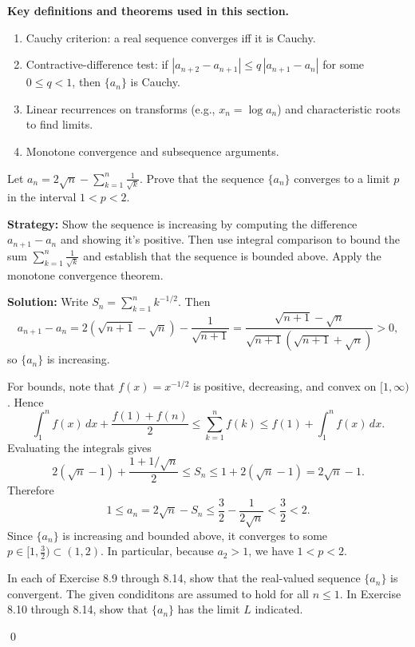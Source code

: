 \noindent\textbf{Key definitions and theorems used in this section.}
\begin{enumerate}
\item Cauchy criterion: a real sequence converges iff it is Cauchy.
\item Contractive-difference test: if \(|a_{n+2}-a_{n+1}|\le q\,|a_{n+1}-a_n|\) for some \(0\le q<1\), then \(\{a_n\}\) is Cauchy.
\item Linear recurrences on transforms (e.g., \(x_n=\log a_n\)) and characteristic roots to find limits.
\item Monotone convergence and subsequence arguments.
\end{enumerate}



\begin{problembox}
Let \(a_n = 2\sqrt{n}-\sum_{k=1}^n \frac{1}{\sqrt{k}}\). Prove that the sequence \(\{a_n\}\) converges to a limit \(p\) in the interval \(1 < p < 2\).
\end{problembox}

\noindent\textbf{Strategy:} Show the sequence is increasing by computing the difference \(a_{n+1}-a_n\) and showing it's positive. Then use integral comparison to bound the sum \(\sum_{k=1}^n \frac{1}{\sqrt{k}}\) and establish that the sequence is bounded above. Apply the monotone convergence theorem.

\bigskip\noindent\textbf{Solution:}
Write \(S_n=\sum_{k=1}^n k^{-1/2}\). Then
\[a_{n+1}-a_n = 2(\sqrt{n+1}-\sqrt{n})-\frac{1}{\sqrt{n+1}} = \frac{\sqrt{n+1}-\sqrt{n}}{\sqrt{n+1}(\sqrt{n+1}+\sqrt{n})} > 0,\]
so \(\{a_n\}\) is increasing.

For bounds, note that \(f(x)=x^{-1/2}\) is positive, decreasing, and convex on \([1,\infty)\). Hence
\[\int_{1}^{n} f(x)\,dx + \frac{f(1)+f(n)}{2} \le \sum_{k=1}^{n} f(k) \le f(1)+\int_{1}^{n} f(x)\,dx.\]
Evaluating the integrals gives
\[2(\sqrt{n}-1)+\frac{1+1/\sqrt{n}}{2} \le S_n \le 1+2(\sqrt{n}-1)=2\sqrt{n}-1.\]
Therefore
\[1 \le a_n = 2\sqrt{n}-S_n \le \frac{3}{2}-\frac{1}{2\sqrt{n}} < \frac{3}{2} < 2.\]
Since \(\{a_n\}\) is increasing and bounded above, it converges to some \(p\in[1,\tfrac{3}{2})\subset(1,2)\). In particular, because \(a_2>1\), we have \(1<p<2\).



\begin{tcolorbox}[colback=red!10,colframe=red!50,arc=3pt,boxrule=1pt]
In each of Exercise 8.9 through 8.14, show that the real-valued sequence $\{a_n\}$ is convergent. The given condiditons are assumed to hold for all $n\leq 1$. In Exercise 8.10 through 8.14, show that $\{a_n\}$ has the limit $L$ indicated.
\end{tcolorbox}\qed


